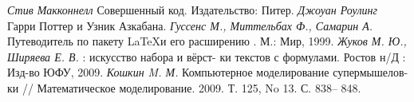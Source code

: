 \begin{thebibliography}{00}
\textit{Стив Макконнелл} Совершенный код. Издательство: Питер.
\textit{Джоуан Роулинг} Гарри Поттер и Узник Азкабана.
\textit{Гуссенс М., Миттельбах Ф., Самарин А.} Путеводитель по пакету
\LaTeX и его расширению \LaTeXe . М.: Мир, 1999.
\textit{Жуков М. Ю., Ширяева Е. В.} \LaTeXe : искусство набора и вёрст-
ки текстов с формулами. Ростов н/Д : Изд-во ЮФУ, 2009.
\textit{Кошкин M. М.} Компьютерное моделирование супермышелов-
ки // Математическое моделирование. 2009. Т. 125, No 13. С. 838–
848.
\end{thebibliography}
